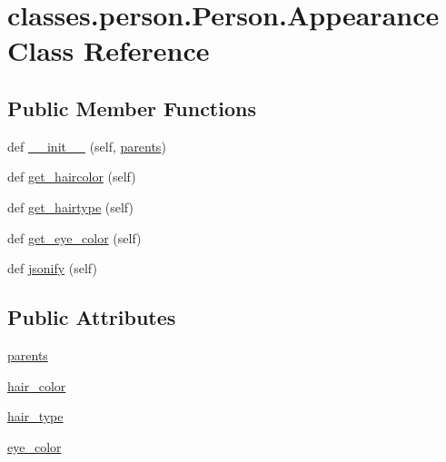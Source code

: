 \hypertarget{classclasses_1_1person_1_1Person_1_1Appearance}{}\section{classes.\+person.\+Person.\+Appearance Class Reference}
\label{classclasses_1_1person_1_1Person_1_1Appearance}
\subsection*{Public Member Functions}
\begin{DoxyCompactItemize}
\item 
def \hyperlink{classclasses_1_1person_1_1Person_1_1Appearance_a818129ceb66b3e6009edbbc7aee40eaa}{\+\_\+\+\_\+init\+\_\+\+\_\+} (self, \hyperlink{classclasses_1_1person_1_1Person_1_1Appearance_a1df52253345f7c09dc2c7a29ee8d95a4}{parents})
\item 
def \hyperlink{classclasses_1_1person_1_1Person_1_1Appearance_a6980b980c3d44a0a7b5a80a23df70074}{get\+\_\+haircolor} (self)
\item 
def \hyperlink{classclasses_1_1person_1_1Person_1_1Appearance_ae7530440c0601981b638b754a9436f6e}{get\+\_\+hairtype} (self)
\item 
def \hyperlink{classclasses_1_1person_1_1Person_1_1Appearance_a6c9306c87bc8a8ded5065b4d64734642}{get\+\_\+eye\+\_\+color} (self)
\item 
def \hyperlink{classclasses_1_1person_1_1Person_1_1Appearance_adaa6bd51a225eea48fcd849102a89ba4}{jsonify} (self)
\end{DoxyCompactItemize}
\subsection*{Public Attributes}
\begin{DoxyCompactItemize}
\item 
\hyperlink{classclasses_1_1person_1_1Person_1_1Appearance_a1df52253345f7c09dc2c7a29ee8d95a4}{parents}
\item 
\hyperlink{classclasses_1_1person_1_1Person_1_1Appearance_a56d51783d3d41ff3b33bd91df790f007}{hair\+\_\+color}
\item 
\hyperlink{classclasses_1_1person_1_1Person_1_1Appearance_a24c0ce44f306454dce4c506405670e45}{hair\+\_\+type}
\item 
\hyperlink{classclasses_1_1person_1_1Person_1_1Appearance_accf955aa75956abf21c374803af2775a}{eye\+\_\+color}
\end{DoxyCompactItemize}


